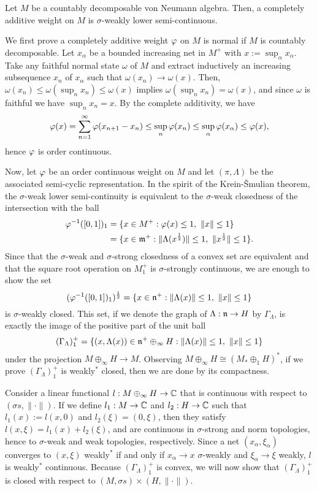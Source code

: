 \documentclass{../../small}
\begin{document}
\begin{thm}
Let $M$ be a countably decomposable von Neumann algebra.
Then, a completely additive weight on $M$ is $\sigma$-weakly lower semi-continuous.
\end{thm}
\begin{pf}
We first prove a completely additive weight $\varphi$ on $M$ is normal if $M$ is countably decomposable.
Let $x_\alpha$ be a bounded increasing net in $M^+$ with $x:=\sup_\alpha x_\alpha$.
Take any faithful normal state $\omega$ of $M$ and extract inductively an increasing subsequence $x_n$ of $x_\alpha$ such that $\omega(x_n)\to\omega(x)$.
Then, $\omega(x_n)\le\omega(\sup_nx_n)\le\omega(x)$ implies $\omega(\sup_nx_n)=\omega(x)$, and since $\omega$ is faithful we have $\sup_nx_n=x$.
By the complete additivity, we have
\[\varphi(x)=\sum_{n=1}^\infty\varphi(x_{n+1}-x_n)\le\sup_n\varphi(x_n)\le\sup_\alpha\varphi(x_\alpha)\le\varphi(x),\]
hence $\varphi$ is order continuous.


Now, let $\varphi$ be an order continuous weight on $M$ and let $(\pi,\Lambda)$ be the associated semi-cyclic representation.
In the spirit of the Krein-\v Smulian theorem, the $\sigma$-weak lower semi-continuity is equivalent to the $\sigma$-weak closedness of the intersection with the ball
\begin{align*}
\varphi^{-1}([0,1])_1
&=\{x\in M^+:\varphi(x)\le1,\ \|x\|\le1\}\\
&=\{x\in\mathfrak{m}^+:\|\Lambda(x^{\frac12})\|\le1,\ \|x^{\frac12}\|\le1\}.
\end{align*}
Since that the $\sigma$-weak and $\sigma$-strong closedness of a convex set are equivalent and that the square root operation on $M^+_1$ is $\sigma$-strongly continuous, we are enough to show the set
\[(\f^{-1}([0,1])_1)^{\frac12}=\{x\in\fn^+:\|\Lambda(x)\|\le1,\ \|x\|\le1\}\]
is $\sigma$-weakly closed.
This set, if we denote the graph of $\Lambda:\mathfrak{n}\to H$ by $\Gamma_\Lambda$, is exactly the image of the positive part of the unit ball
\[(\Gamma_\Lambda)^+_1=\{(x,\Lambda(x))\in\mathfrak{n}^+\oplus_\infty H:\|\Lambda(x)\|\le1,\ \|x\|\le1\}\]
under the projection $M\oplus_\infty H\to M$.
Observing $M\oplus_\infty H\cong(M_*\oplus_1H)^*$, if we prove $(\Gamma_\Lambda)_1^+$ is weakly$^*$ closed, then we are done by its compactness.

Consider a linear functional $l:M\oplus_\infty H\to\mathbb{C}$ that is continuous with respect to $(\sigma s,\|\cdot\|)$.
If we define $l_1:M\to\mathbb{C}$ and $l_2:H\to\mathbb{C}$ such that $l_1(x):=l(x,0)$ and $l_2(\xi)=(0,\xi)$, then they satisfy $l(x,\xi)=l_1(x)+l_2(\xi)$, and are continuous in $\sigma$-strong and norm topologies, hence to $\sigma$-weak and weak topologies, respectively.
Since a net $(x_\alpha,\xi_\alpha)$ converges to $(x,\xi)$ weakly$^*$ if and only if $x_\alpha\to x$ $\sigma$-weakly and $\xi_\alpha\to\xi$ weakly, $l$ is weakly$^*$ continuous.
Because $(\Gamma_\Lambda)_1^+$ is convex, we will now show that $(\Gamma_\Lambda)^+_1$ is closed with respect to $(M,\sigma s)\times(H,\|\cdot\|)$.


\end{pf}
\end{document}
